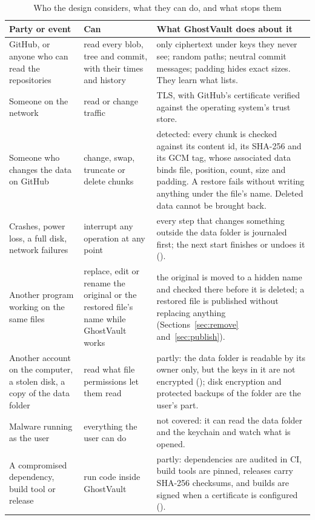 \begin{table}[t]
\caption{Who the design considers, what they can do, and what stops them}\label{tab:parties}
\centering\footnotesize
\begin{tabularx}{\textwidth}{@{}L{36mm}L{48mm}Y@{}}
\toprule
\textbf{Party or event} & \textbf{Can} & \textbf{What GhostVault does about it} \\
\midrule
GitHub, or anyone who can read the repositories & read every blob, tree and commit, with their
times and history & only ciphertext under keys they never see; random paths; neutral commit
messages; padding hides exact sizes. They learn what  lists. \\ \addlinespace[1.6pt]
Someone on the network & read or change traffic & TLS, with GitHub's certificate verified against
the operating system's trust store. \\ \addlinespace[1.6pt]
Someone who changes the data on GitHub & change, swap, truncate or delete chunks & detected: every
chunk is checked against its content id, its SHA-256 and its GCM tag, whose associated data binds
file, position, count, size and padding. A restore fails without writing anything under the file's
name. Deleted data cannot be brought back. \\ \addlinespace[1.6pt]
Crashes, power loss, a full disk, network failures & interrupt any operation at any point & every
step that changes something outside the data folder is journaled first; the next start finishes or
undoes it (). \\ \addlinespace[1.6pt]
Another program working on the same files & replace, edit or rename the original or the restored
file's name while GhostVault works & the original is moved to a hidden name and checked there before
it is deleted; a restored file is published without replacing anything (Sections~\ref{sec:remove}
and~\ref{sec:publish}). \\ \addlinespace[1.6pt]
Another account on the computer, a stolen disk, a copy of the data folder & read what file
permissions let them read & partly: the data folder is readable by its owner only, but the keys
in it are not encrypted (); disk encryption and protected backups of the folder
are the user's part. \\ \addlinespace[1.6pt]
Malware running as the user & everything the user can do & not covered: it can read the data
folder and the keychain and watch what is opened. \\ \addlinespace[1.6pt]
A compromised dependency, build tool or release & run code inside GhostVault & partly:
dependencies are audited in CI, build tools are pinned, releases carry SHA-256 checksums, and builds
are signed when a certificate is configured (). \\
\bottomrule
\end{tabularx}
\end{table}

